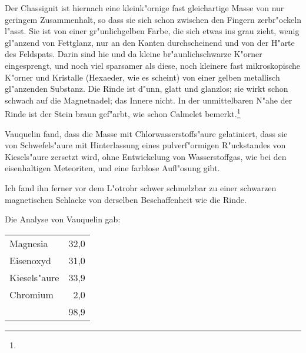 \documentclass[a4paper, 11pt, oneside]{article}
\begin{document}
Der Chassignit ist hiernach eine kleink"ornige fast gleichartige Masse von nur geringem Zusammenhalt, so dass sie sich schon zwischen den Fingern zerbr"ockeln l"asst. Sie ist von einer gr"unlichgelben Farbe, die sich etwas ins grau zieht, wenig gl"anzend von Fettglanz, nur an den Kanten durchscheinend und von der H"arte des Feldspats. Darin sind hie und da kleine br"aunlichschwarze K"orner eingesprengt, und noch viel sparsamer als diese, noch kleinere fast mikroskopische K"orner und Kristalle (Hexaeder, wie es scheint) von einer gelben metallisch gl"anzenden Substanz. Die Rinde ist d"unn, glatt und glanzlos; sie wirkt schon schwach auf die Magnetnadel; das Innere nicht. In der unmittelbaren N"ahe der Rinde ist der Stein braun gef"arbt, wie schon Calmelet bemerkt.\footnote{}

Vauquelin fand, dass die Masse mit Chlorwasserstoffs"aure gelatiniert, dass sie von Schwefels"aure mit Hinterlassung eines pulverf"ormigen R"uckstandes von Kiesels"aure zersetzt wird, ohne Entwickelung von Wasserstoffgas, wie bei den eisenhaltigen Meteoriten, und eine farblose Aufl"osung gibt.

Ich fand ihn ferner vor dem L"otrohr schwer schmelzbar zu einer schwarzen magnetischen Schlacke von derselben Beschaffenheit wie die Rinde.

Die Analyse von Vauquelin gab:  
\begin{center}
\begin{tabular}{ l r }
    Magnesia & 32,0\\
    Eisenoxyd & 31,0\\
    Kiesels"aure & 33,9\\
    Chromium & 2,0\\
     & 98,9\\
\end{tabular}
\end{center}
\end{document}
